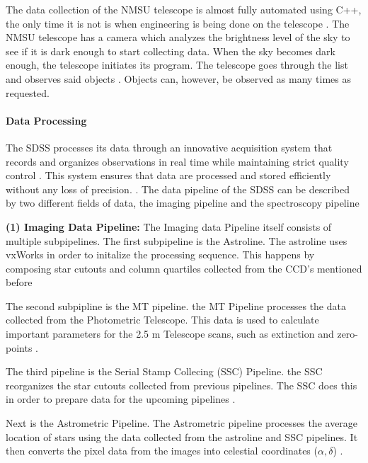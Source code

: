 \documentclass[preprint,linenumbers, longauthor]{aastex631}
\begin{document}
The data collection of the NMSU telescope is almost fully automated using C++, the only time it is not is when engineering is being done on the telescope \cite{holtzmanNMSU1Telescope2010}.
The NMSU telescope has a camera which analyzes the brightness level of the sky to see if it is dark enough to start collecting data.
When the sky becomes dark enough, the telescope initiates its program. The telescope goes through the list and observes said objects \cite{holtzmanNMSU1Telescope2010}.
Objects can, however, be observed as many times as requested. 

\paragraph{Data Processing} 
The SDSS processes its data through an innovative acquisition system that records and organizes observations in real time while maintaining strict quality control \cite{gunn25TelescopeSloan2006}. 
This system ensures that data are processed and stored efficiently without any loss of precision. \cite{gunn25TelescopeSloan2006}. 
The data pipeline of the SDSS can be described by two different fields of data, the imaging pipeline and the spectroscopy pipeline

 \textbf{(1) Imaging Data Pipeline:} 
  The Imaging data Pipeline itself consists of multiple subpipelines. 
  The first subpipeline is the Astroline. The astroline uses vxWorks in order to initalize the processing sequence.
  This happens by composing star cutouts and column quartiles collected from the CCD's mentioned before \citep{luptonSDSSImagingPipelines2001}

  The second subpipline is the MT pipeline. the MT Pipeline processes the data collected from the Photometric Telescope. 
  This data is used to calculate important parameters for the 2.5 m Telescope scans, such as extinction and zero-points \citep{luptonSDSSImagingPipelines2001}.

  The third pipeline is the Serial Stamp Collecing (SSC) Pipeline. the SSC reorganizes the star cutouts collected from previous pipelines.
  The SSC does this in order to prepare data for the upcoming pipelines \citep{luptonSDSSImagingPipelines2001}.

  Next is the Astrometric Pipeline. The Astrometric pipeline processes the average location of stars using the data collected from the astroline and SSC pipelines. 
  It then converts the pixel data from the images into celestial coordinates ($\alpha, \delta$) \citep{luptonSDSSImagingPipelines2001}.
\end{document}
